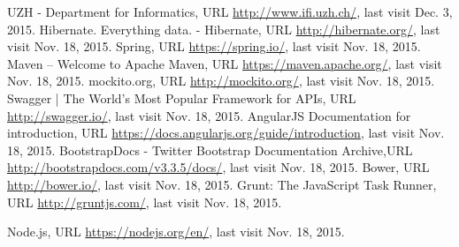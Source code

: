 \begin{thebibliography}{99}

 UZH - Department for Informatics, URL \url{http://www.ifi.uzh.ch/}, last visit Dec. 3, 2015.
 Hibernate. Everything data. - Hibernate, URL \url{http://hibernate.org/}, last visit Nov. 18, 2015.
 Spring, URL \url{https://spring.io/}, last visit Nov. 18, 2015.
 Maven – Welcome to Apache Maven, URL \url{https://maven.apache.org/}, last visit Nov. 18, 2015.
 mockito.org, URL \url{http://mockito.org/}, last visit Nov. 18, 2015.
 Swagger | The World's Most Popular Framework for APIs, URL \url{http://swagger.io/}, last visit Nov. 18, 2015.
 AngularJS Documentation for introduction, URL \url{https://docs.angularjs.org/guide/introduction}, last visit Nov. 18, 2015.
 BootstrapDocs - Twitter Bootstrap Documentation Archive,\newline URL \url{http://bootstrapdocs.com/v3.3.5/docs/}, last visit Nov. 18, 2015.
 Bower, URL \url{http://bower.io/}, last visit Nov. 18, 2015.
 Grunt: The JavaScript Task Runner, URL \url{http://gruntjs.com/}, last visit Nov. 18, 2015.

 Node.js, URL \url{https://nodejs.org/en/}, last visit Nov. 18, 2015.



\end{thebibliography}

